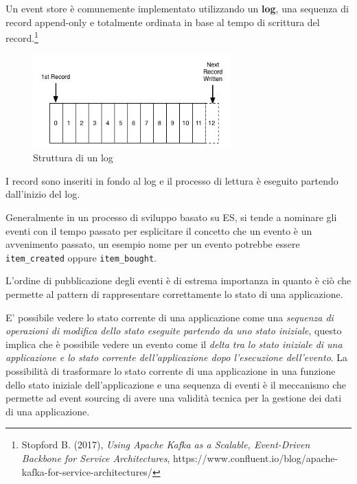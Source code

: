 \documentclass[]{article}
\begin{document}
Un event store è comunemente implementato utilizzando un \textbf{log},
una sequenza di record append-only e totalmente ordinata in base al
tempo di scrittura del record.\footnote{Stopford B. (2017), \emph{Using
  Apache Kafka as a Scalable, Event-Driven Backbone for Service
  Architectures},
  https://www.confluent.io/blog/apache-kafka-for-service-architectures/}

\begin{figure}
\centering
\includegraphics[width=0.68000\textwidth]{../images/log.png}
\caption{Struttura di un log \label{figure_1}}
\end{figure}

I record sono inseriti in fondo al log e il processo di lettura è
eseguito partendo dall'inizio del log.

Generalmente in un processo di sviluppo basato su ES, si tende a
nominare gli eventi con il tempo passato per esplicitare il concetto che
un evento è un avvenimento passato, un esempio nome per un evento
potrebbe essere \texttt{item\_created} oppure \texttt{item\_bought}.

L'ordine di pubblicazione degli eventi è di estrema importanza in quanto
è ciò che permette al pattern di rappresentare correttamente lo stato di
una applicazione.

E' possibile vedere lo stato corrente di una applicazione come una
\emph{sequenza di operazioni di modifica dello stato eseguite partendo
da uno stato iniziale}, questo implica che è possibile vedere un evento
come il \emph{delta tra lo stato iniziale di una applicazione e lo stato
corrente dell'applicazione dopo l'esecuzione dell'evento}. La
possibilità di trasformare lo stato corrente di una applicazione in una
funzione dello stato iniziale dell'applicazione e una sequenza di eventi
è il meccanismo che permette ad event sourcing di avere una validità
tecnica per la gestione dei dati di una applicazione.
\end{document}
